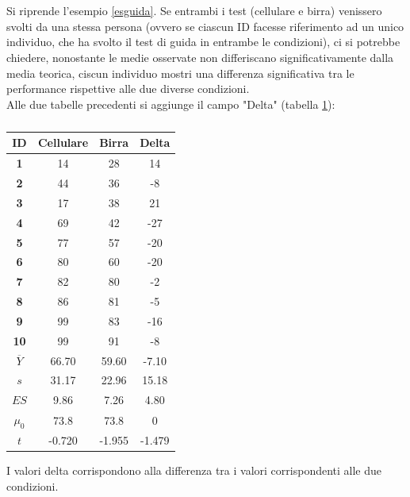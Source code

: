 \documentclass[10pt, draft]{book}
\begin{document}
\section{}
Si riprende l'esempio \ref{esguida}. Se entrambi i test (cellulare e birra) venissero svolti da una stessa persona (ovvero se ciascun ID facesse riferimento ad un unico individuo, che ha svolto il test di guida in entrambe le condizioni), ci si potrebbe chiedere, nonostante le medie osservate non differiscano significativamente dalla media teorica, ciscun individuo mostri una differenza significativa tra le performance rispettive alle due diverse condizioni.
\\
Alle due tabelle precedenti si aggiunge il campo "Delta" (tabella \ref{tabguida3}):
\begin{table}[H]
    \centering
    \renewcommand\arraystretch{1.2}
    \begin{tabular}{c|c|c||c}
    \hline
    \textbf{ID}& \textbf{Cellulare} & \textbf{Birra} & \textbf{Delta}\\
    \hline
    \textbf{1} & 14 & 28 & 14\\
    \hline
    \textbf{2} & 44 & 36 & -8\\
    \hline
    \textbf{3} & 17 & 38 & 21\\
    \hline
    \textbf{4} & 69 & 42 & -27\\
    \hline
    \textbf{5} & 77 & 57 & -20\\
    \hline
    \textbf{6} & 80 & 60 & -20\\
    \hline
    \textbf{7} & 82 & 80 & -2\\
    \hline
    \textbf{8} & 86 & 81 & -5\\
    \hline
    \textbf{9} & 99 & 83 & -16\\
    \hline
    \textbf{10} & 99 & 91 & -8\\
    \hline
    \hline
    \textbf{$\overline{Y}$} & 66.70 & 59.60 & -7.10\\
    \hline
    \textbf{$s$} & 31.17 & 22.96 & 15.18\\
    \hline
    \textbf{$ES$} & 9.86 & 7.26 & 4.80\\
    \hline
    \textbf{$\mu_0$} & 73.8 & 73.8 & 0\\
    \hline
    \textbf{$t$} & -0.720 & -1.955 & -1.479\\
    \hline
    \end{tabular}
    \caption{\small{}}
    \label{tabguida3}
\end{table}\noindent
I valori delta corrispondono alla differenza tra i valori corrispondenti alle due condizioni.
\end{document}
